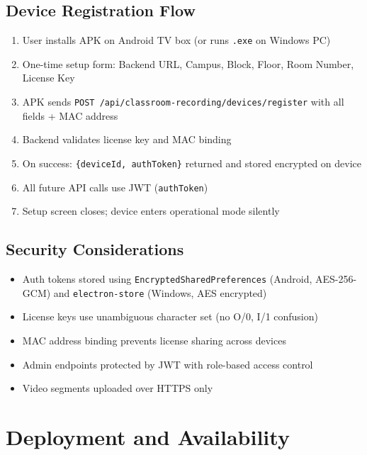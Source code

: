 \documentclass[12pt,a4paper]{article}
\begin{document}
\subsection{Device Registration Flow}

\begin{enumerate}
    \item User installs APK on Android TV box (or runs \texttt{.exe} on Windows PC)
    \item One-time setup form: Backend URL, Campus, Block, Floor, Room Number, License Key
    \item APK sends \texttt{POST /api/classroom-recording/devices/register} with all fields + MAC address
    \item Backend validates license key and MAC binding
    \item On success: \texttt{\{deviceId, authToken\}} returned and stored encrypted on device
    \item All future API calls use JWT (\texttt{authToken})
    \item Setup screen closes; device enters operational mode silently
\end{enumerate}

\subsection{Security Considerations}

\begin{itemize}
    \item Auth tokens stored using \texttt{EncryptedSharedPreferences} (Android, AES-256-GCM) and \texttt{electron-store} (Windows, AES encrypted)
    \item License keys use unambiguous character set (no O/0, I/1 confusion)
    \item MAC address binding prevents license sharing across devices
    \item Admin endpoints protected by JWT with role-based access control
    \item Video segments uploaded over HTTPS only
\end{itemize}

\section{Deployment and Availability}
\end{document}

